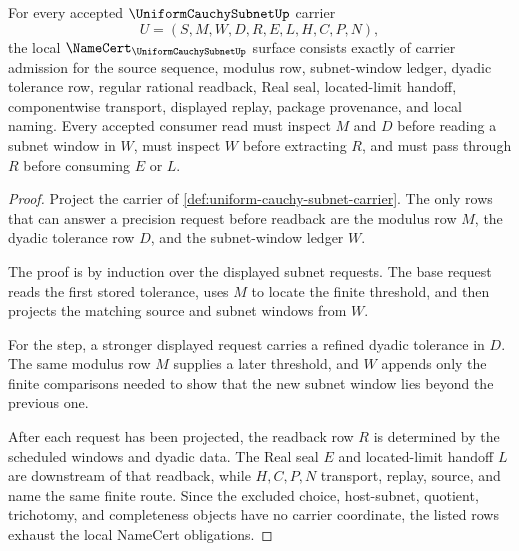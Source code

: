\begin{theorem}
\label{thm:uniform-cauchy-subnet-namecert-obligations}
For every accepted $\UniformCauchySubnetUp$ carrier
$$
U=(S,M,W,D,R,E,L,H,C,P,N),
$$
the local $\NameCert_{\UniformCauchySubnetUp}$ surface consists exactly of carrier admission for the source sequence, modulus row, subnet-window ledger, dyadic tolerance row, regular rational readback, Real seal, located-limit handoff, componentwise transport, displayed replay, package provenance, and local naming. Every accepted consumer read must inspect $M$ and $D$ before reading a subnet window in $W$, must inspect $W$ before extracting $R$, and must pass through $R$ before consuming $E$ or $L$.
\end{theorem}
\begin{proof}
Project the carrier of \autoref{def:uniform-cauchy-subnet-carrier}. The only rows that can answer a precision request before readback are the modulus row $M$, the dyadic tolerance row $D$, and the subnet-window ledger $W$.

The proof is by induction over the displayed subnet requests. The base request reads the first stored tolerance, uses $M$ to locate the finite threshold, and then projects the matching source and subnet windows from $W$.

For the step, a stronger displayed request carries a refined dyadic tolerance in $D$. The same modulus row $M$ supplies a later threshold, and $W$ appends only the finite comparisons needed to show that the new subnet window lies beyond the previous one.

After each request has been projected, the readback row $R$ is determined by the scheduled windows and dyadic data. The Real seal $E$ and located-limit handoff $L$ are downstream of that readback, while $H,C,P,N$ transport, replay, source, and name the same finite route. Since the excluded choice, host-subnet, quotient, trichotomy, and completeness objects have no carrier coordinate, the listed rows exhaust the local NameCert obligations.
\end{proof}

